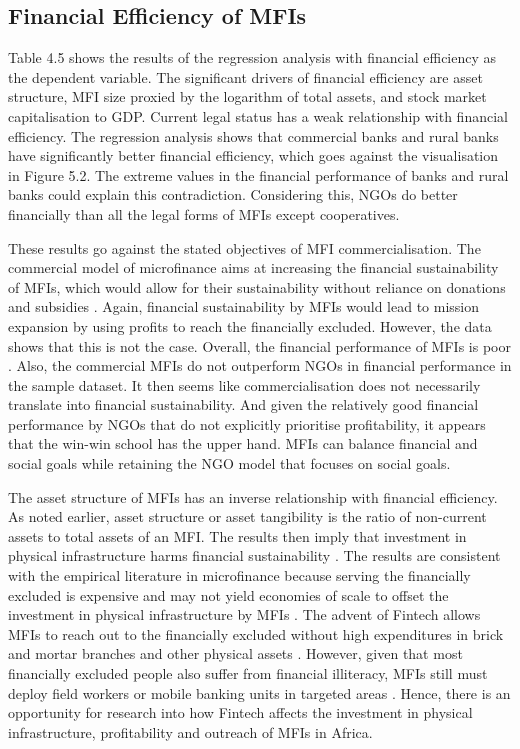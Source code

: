 \documentclass[a4paper, nobind]{templates/ociamthesis}
\begin{document}
\hypertarget{financial-efficiency-of-mfis}{%
\subsection{Financial Efficiency of MFIs}\label{financial-efficiency-of-mfis}}

Table 4.5 shows the results of the regression analysis with financial efficiency as the dependent variable. The significant drivers of financial efficiency are asset structure, MFI size proxied by the logarithm of total assets, and stock market capitalisation to GDP. Current legal status has a weak relationship with financial efficiency. The regression analysis shows that commercial banks and rural banks have significantly better financial efficiency, which goes against the visualisation in Figure 5.2. The extreme values in the financial performance of banks and rural banks could explain this contradiction. Considering this, NGOs do better financially than all the legal forms of MFIs except cooperatives.

These results go against the stated objectives of MFI commercialisation. The commercial model of microfinance aims at increasing the financial sustainability of MFIs, which would allow for their sustainability without reliance on donations and subsidies \autocite{d2017ngos}. Again, financial sustainability by MFIs would lead to mission expansion by using profits to reach the financially excluded. However, the data shows that this is not the case. Overall, the financial performance of MFIs is poor \autocite{mersland2010microfinance}. Also, the commercial MFIs do not outperform NGOs in financial performance in the sample dataset. It then seems like commercialisation does not necessarily translate into financial sustainability. And given the relatively good financial performance by NGOs that do not explicitly prioritise profitability, it appears that the win-win school has the upper hand. MFIs can balance financial and social goals while retaining the NGO model that focuses on social goals.

The asset structure of MFIs has an inverse relationship with financial efficiency. As noted earlier, asset structure or asset tangibility is the ratio of non-current assets to total assets of an MFI. The results then imply that investment in physical infrastructure harms financial sustainability \autocite{iman2018mobile,demirguc2018global}. The results are consistent with the empirical literature in microfinance because serving the financially excluded is expensive and may not yield economies of scale to offset the investment in physical infrastructure by MFIs \autocite{quayes2019probability}. The advent of Fintech allows MFIs to reach out to the financially excluded without high expenditures in brick and mortar branches and other physical assets \autocite{iman2018mobile}. However, given that most financially excluded people also suffer from financial illiteracy, MFIs still must deploy field workers or mobile banking units in targeted areas \autocite{allen2014african}. Hence, there is an opportunity for research into how Fintech affects the investment in physical infrastructure, profitability and outreach of MFIs in Africa.
\end{document}
